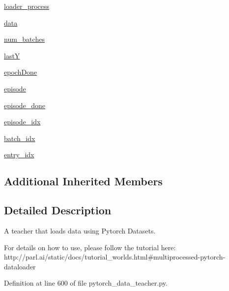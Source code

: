 \begin{DoxyCompactItemize}
\hyperlink{classparlai_1_1core_1_1pytorch__data__teacher_1_1PytorchDataTeacher_a7d0c50251b2e88746aa6a6ff4a454ca8}{loader\+\_\+process}
\item 
\hyperlink{classparlai_1_1core_1_1pytorch__data__teacher_1_1PytorchDataTeacher_afc57c27e502b27aff86630e7d9768700}{data}
\item 
\hyperlink{classparlai_1_1core_1_1pytorch__data__teacher_1_1PytorchDataTeacher_abaa8cbd02f036fb06d9e5290d331bb40}{num\+\_\+batches}
\item 
\hyperlink{classparlai_1_1core_1_1pytorch__data__teacher_1_1PytorchDataTeacher_a452bb226c67e6c4002679fa293433e27}{lastY}
\item 
\hyperlink{classparlai_1_1core_1_1pytorch__data__teacher_1_1PytorchDataTeacher_ad39ab22ed0829965a4e418ccda1f5b51}{epoch\+Done}
\item 
\hyperlink{classparlai_1_1core_1_1pytorch__data__teacher_1_1PytorchDataTeacher_a65bef2570fe8e94a2077fc30240e4524}{episode}
\item 
\hyperlink{classparlai_1_1core_1_1pytorch__data__teacher_1_1PytorchDataTeacher_a7b3026e037904f2e92282729dc53bd13}{episode\+\_\+done}
\item 
\hyperlink{classparlai_1_1core_1_1pytorch__data__teacher_1_1PytorchDataTeacher_a096cd29f1b94d0fb626505907280494e}{episode\+\_\+idx}
\item 
\hyperlink{classparlai_1_1core_1_1pytorch__data__teacher_1_1PytorchDataTeacher_af2d84c6c04e53cc119de23ad07efbbe3}{batch\+\_\+idx}
\item 
\hyperlink{classparlai_1_1core_1_1pytorch__data__teacher_1_1PytorchDataTeacher_ab0e45ca1923e9b99747c117dfbaa95f3}{entry\+\_\+idx}
\end{DoxyCompactItemize}
\subsection*{Additional Inherited Members}


\subsection{Detailed Description}
\begin{DoxyVerb}A teacher that loads data using Pytorch Datasets.

For details on how to use, please follow the tutorial here:
http://parl.ai/static/docs/tutorial_worlds.html#multiprocessed-pytorch-dataloader
\end{DoxyVerb}
 

Definition at line 600 of file pytorch\+\_\+data\+\_\+teacher.\+py.



